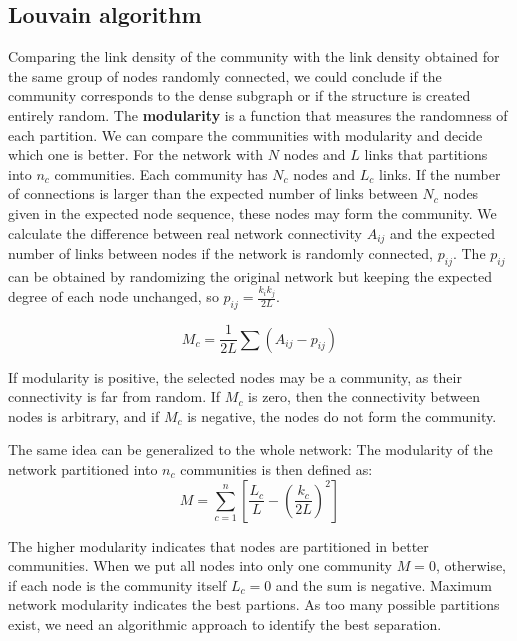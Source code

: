 \subsection{Louvain algorithm}

Comparing the link density of the community with the link density obtained for the same group of nodes randomly connected, we could conclude if the community corresponds to the dense subgraph or if the structure is created entirely random. The \textbf{modularity} \cite{guimera2004modularity, good2010performance} is a function that measures the randomness of each partition. %
We can compare the communities with modularity and decide which one is better. For the network with $N$ nodes and $L$ links that partitions into $n_c$ communities. Each community has $N_c$ nodes and $L_c$ links. If the number of connections is larger than the expected number of links between $N_c$ nodes given in the expected node sequence, these nodes may form the community. We calculate the difference between real network connectivity $A_{ij}$ and the expected number of links between nodes if the network is randomly connected, $p_{ij}$. The $p_{ij}$ can be obtained by randomizing the original network but keeping the expected degree of each node unchanged, so $p_{ij}= \frac{k_ik_j}{2L}$.

\begin{equation}
M_c = \frac{1}{2L}\sum(A_{ij}-p_{ij})
\end{equation}

If modularity is positive, the selected nodes may be a community, as their connectivity is far from random. If $M_c$ is zero, then the connectivity between nodes is arbitrary, and if $M_c$ is negative, the nodes do not form the community. 

The same idea can be generalized to the whole network: The modularity of the network partitioned into $n_c$ communities is then defined as:
\begin{equation}
M=\sum_{c=1}^{n} [\frac{L_c}{L} - (\frac{k_c}{2L})^2]
\end{equation}

The higher modularity indicates that nodes are partitioned in better communities. When we put all nodes into only one community $M=0$, otherwise, if each node is the community itself $L_c=0$ and the sum is negative. Maximum network modularity indicates the best partions. As too many possible partitions exist, we need an algorithmic approach to identify the best separation. 

